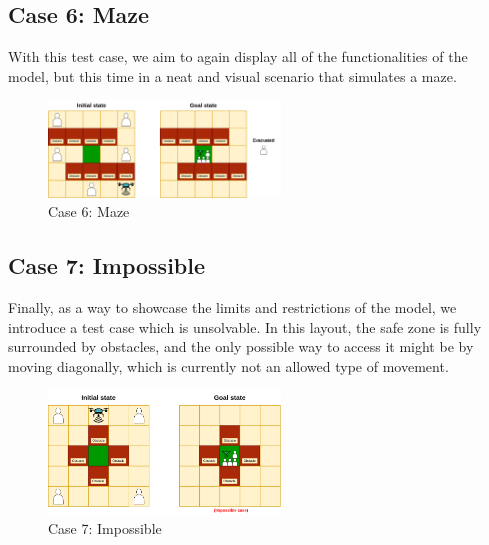\documentclass{article}
\begin{document}
\FloatBarrier

\subsection{Case 6: Maze}

With this test case, we aim to again display all of the functionalities of the model, but this time in a neat and visual scenario that simulates a maze.

\begin{figure}[ht]
    \centering
    \includegraphics[width=0.55\textwidth]{assets/problem-6-maze.drawio.png} %
    \caption{Case 6: Maze}
    \label{fig:initial-state-maze}
\end{figure}

\FloatBarrier

\subsection{Case 7: Impossible}

Finally, as a way to showcase the limits and restrictions of the model, we introduce a test case which is unsolvable. In this layout, the safe zone is fully surrounded by obstacles, and the only possible way to access it might be by moving diagonally, which is currently not an allowed type of movement.

\begin{figure}[ht]
    \centering
    \includegraphics[width=0.55\textwidth]{assets/problem-7-impossible.drawio.png} %
    \caption{Case 7: Impossible}
    \label{fig:initial-state-impossible}
\end{figure}
\FloatBarrier
\end{document}
